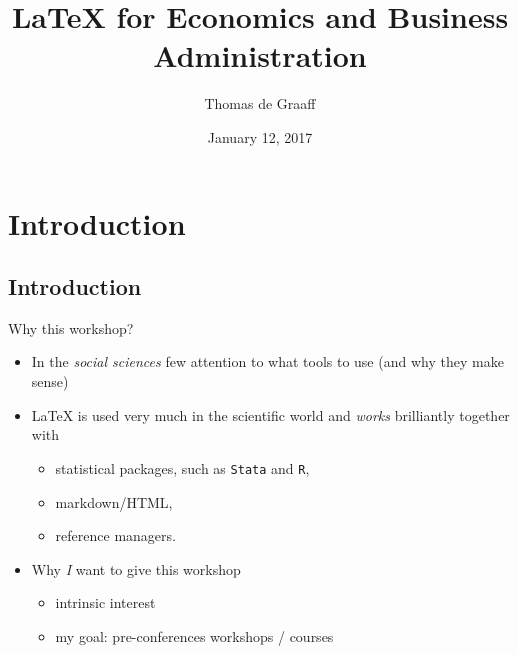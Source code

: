 \documentclass[ignorenonframetext]{beamer}
\title{\LaTeX{} for Economics and Business Administration}
\author{Thomas de Graaff}
\date{January 12, 2017}
\begin{document}
\frame{\titlepage}

\section{Introduction}\label{introduction}

\subsection{Introduction}\label{introduction-1}

\begin{frame}{Why this workshop?}

\begin{itemize}
\item
  In the \emph{social sciences} few attention to what tools to use (and why they make sense)
\item
  \LaTeX{} is used very much in the scientific world and \emph{works} brilliantly together with
  \begin{itemize}
  \item statistical packages, such as \texttt{Stata} and \texttt{R},
  \item markdown/HTML,
  \item reference managers.
  \end{itemize}
  \item Why \emph{I} want to give this workshop
  \begin{itemize}
	  \item intrinsic interest
	  \item my goal: pre-conferences workshops / courses
  \end{itemize}
\end{itemize}
\end{frame}
\end{document}
